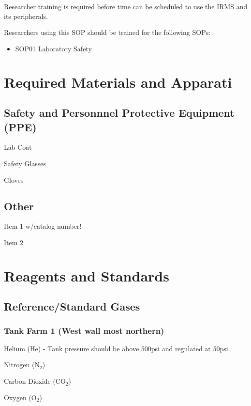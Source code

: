 \documentclass[12pt]{../SOP3_beta}\usepackage[]{graphicx}\usepackage[]{color}
\begin{document}
\NP Researcher training is required before time can be scheduled to use the IRMS and its peripherals.

\NP Researchers using this SOP should be trained for the following SOPs:

\begin{itemize}
  \item SOP01 Laboratory Safety
\end{itemize}

\section{Required Materials and Apparati}

\subsection{Safety and Personnnel Protective Equipment (PPE)}

\NP Lab Coat

\NP Safety Glasses

\NP Gloves

\subsection{Other}

\NP Item 1 w/catalog number!

\NP Item 2

\section{Reagents and Standards}

\subsection{Reference/Standard Gases}

\subsubsection{Tank Farm 1 (West wall most northern)}

\NP Helium (He) - Tank pressure should be above 500psi and regulated at 50psi.

\NP Nitrogen (N$_2$)

\NP Carbon Dioxide (CO$_2$)

\NP Oxygen (O$_2$)
\end{document}

